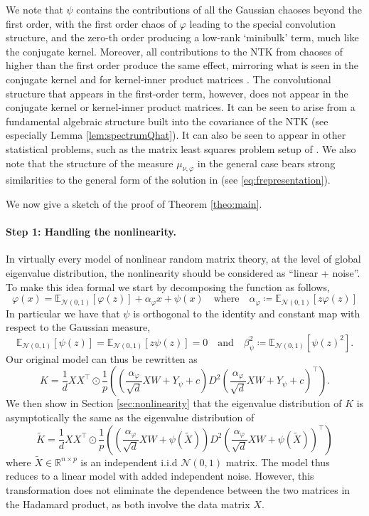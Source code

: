 \documentclass[letterpaper, 10pt, dvipsnames]{article}
\numberwithin{equation}{section}
\newcommand{\Rbb}{\mathbb{R}}
\newcommand{\e}{\mathrm{e}}
\let\d\relax
\newcommand{\d}{\mathrm{d}}
\newcommand{\R}{\mathcal{R}}
\renewcommand{\phi}{\varphi}
\newcommand{\E}{\mathds{E}}
\theoremstyle{definition}
\begin{document}
We note that $\psi$ contains the contributions of all the Gaussian chaoses beyond the first order, with the first order chaos of $\phi$ leading to the special convolution structure, and the zero-th order producing a low-rank `minibulk' term, much like the conjugate kernel.  Moreover, all contributions to the NTK from chaoses of higher than the first order produce the same effect, mirroring what is seen in the conjugate kernel and for kernel-inner product matrices \cites{hastie2022surprises,mei2022generalization,dubova2023universality}.  The convolutional structure that appears in the first-order term, however, does not appear in the conjugate kernel or kernel-inner product matrices.  It can be seen to arise from a fundamental algebraic structure built into the covariance of the NTK (see especially Lemma \ref{lem:spectrumQhat}).  It can also be seen to appear in other statistical problems, such as the matrix least squares problem setup of \cite{fan2024kronecker}.  We also note that the structure of the measure $\mu_{\nu,\varphi}$ in the general case bears strong similarities to the general form of the solution in \cite{fan2024kronecker} (see \eqref{eq:frepresentation}).

We now give a sketch of the proof of Theorem \ref{theo:main}.
\paragraph{Step 1: Handling the nonlinearity.} In virtually every model of nonlinear random matrix theory, at the level of global eigenvalue distribution, the nonlinearity should be considered as ``linear + noise''. To make this idea formal we start by decomposing the function as follows,
\[
\phi(x)  =  \mathbb{E}_{\mathcal{N}(0,1)}\left[\phi(z)\right] + \alpha_\phi x + \psi(x)
\quad\text{where}\quad 
\alpha_\phi \coloneqq 
\E_{\mathcal{N}(0,1)}\left[
  z\phi(z)
  \right]
\]
In particular we have that $\psi$ is orthogonal to the identity and constant map with respect to the Gaussian measure,
\[
  \E_{\mathcal{N}(0,1)}\left[\psi(z)\right]=\E_{\mathcal{N}(0,1)}\left[z\psi(z)\right] =0
  \quad\text{and}\quad
  \beta_\psi^2 \coloneqq \E_{\mathcal{N}(0,1)}\left[
    \psi(z)^2
    \right].
\]
Our original model can thus be rewritten as 
\[
K = \frac{1}{d}XX^\top \odot 
\frac{1}{p}
\left(
  \left(\frac{\alpha_\phi}{\sqrt{d}} XW + Y_\psi + c\right)
  D^2
  \left(\frac{\alpha_\phi}{\sqrt{d}} XW + Y_\psi + c\right)^{\top}
  \right).    
\]
We then show in Section \ref{sec:nonlinearity} that the eigenvalue distribution of $K$ is asymptotically the same as the eigenvalue distribution of 
\[
\widetilde{K} = \frac{1}{d}XX^\top \odot 
\frac{1}{p}
\left(
  \left(\frac{\alpha_\phi}{\sqrt{d}} XW + \psi(\widetilde{X})\right)
  D^2
  \left(\frac{\alpha_\phi}{\sqrt{d}} XW + \psi(\widetilde{X})\right)^{\top}
  \right)
\]
where $\widetilde{X}\in\Rbb^{n\times p}$ is an independent i.i.d $\mathcal{N}(0,1)$ matrix. The model thus reduces to a linear model with added independent noise. However, this transformation does not eliminate the dependence between the two matrices in the Hadamard product, as both involve the data matrix $X$.
\end{document}
